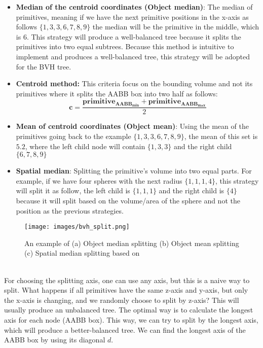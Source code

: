 \documentclass[11pt,a4paper]{article}
\begin{document}
\begin{itemize}
\item \textbf{Median of the centroid coordinates (Object median)}: The median of primitives, meaning if we have the next primitive positions in the x-axis as follows $\{1, 3, 3, 6, 7, 8, 9\}$ the median will be the primitive in the middle, which is $6$. This strategy will produce a well-balanced tree because it splits the primitives into two equal subtrees. Because this method is intuitive to implement and produces a well-balanced tree, this strategy will be adopted for the BVH tree. 

\item \textbf{Centroid method:}
This criteria focus on the bounding volume and not its primitives where it splits the AABB box into two half as follows:
\begin{equation}
\boldsymbol{c} = \frac{\boldsymbol{primitive_{AABB_{min}}}+\boldsymbol{primitive_{AABB_{max}}}}{2}
\end{equation}

\item  \textbf{Mean of centroid coordinates (Object mean)}: Using the mean of the primitives going back to the example $\{1, 3, 3, 6, 7, 8, 9\}$, the mean of this set is $5.2$, where the left child node will contain $\{1,3,3\}$ and the right child $\{6,7,8,9\}$

\item  \textbf{Spatial median}: Splitting the primitive's volume into two equal parts. For example, if we have four spheres with the next radius $\{1,1,1,4\}$, this strategy will split it as follow, the left child is $\{1,1,1\}$ and the right child is $\{4\}$ because it will split based on the volume/area of the sphere and not the position as the previous strategies. 


\end{itemize}


\begin{figure}[H]	
     \centering
     \captionsetup{justification=centering,margin=2cm}
     \texttt{[image: images/bvh\_split.png]}
     \caption{An example of (a) Object median splitting (b) Object mean splitting (c) Spatial median
splitting based on \protect\cite{Ericson2004}}
        \label{fig:dice}
\end{figure}

\noindent
\\
For choosing the splitting axis, one can use any axis, but this is a naive way to split. What happens if all primitives have the same z-axis and y-axis, but only the x-axis is changing, and we randomly choose to split by z-axis? This will usually produce an unbalanced tree. The optimal way is to calculate the longest axis for each node (AABB box). This way, we can try to split by the longest axis, which will produce a better-balanced tree. We can find the longest axis of the AABB box by using its diagonal $d$. 
\end{document}
